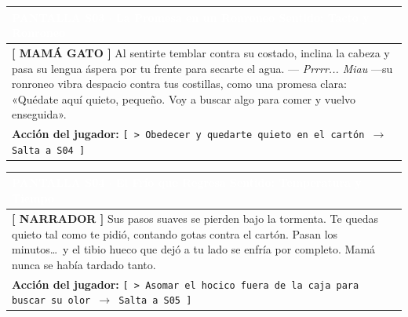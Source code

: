 \documentclass[11pt, a4paper]{article}
\begin{document}
\vspace{1em}

\noindent
\begin{tabularx}{\textwidth}{|X|}
\hline
\rowcolor{colorHeader}
\textbf{\textcolor{white}{PANTALLA S03 $\cdot$ La Promesa en un Ronroneo}} \hfill \small\textcolor{white}{Sentido: Tacto y Ronroneo} \\ \hline
\rowcolor{colorTextoBox}
\textbf{\textcolor{colorEmisor}{[ MAMÁ GATO ]}} \vspace{0.2em}\newline
Al sentirte temblar contra su costado, inclina la cabeza y pasa su lengua áspera por tu frente para secarte el agua. \newline
--- \textit{Prrrr... Miau} ---su ronroneo vibra despacio contra tus costillas, como una promesa clara: «Quédate aquí quieto, pequeño. Voy a buscar algo para comer y vuelvo enseguida». \\ \hline
\rowcolor{colorBotonBox}
\textbf{Acción del jugador:} \newline
\texttt{[ > Obedecer y quedarte quieto en el cartón $\rightarrow$ Salta a S04 ]} \\ \hline
\end{tabularx}

\vspace{1em}

\noindent
\begin{tabularx}{\textwidth}{|X|}
\hline
\rowcolor{colorHeader}
\textbf{\textcolor{white}{PANTALLA S04 $\cdot$ El Frío que Regresa}} \hfill \small\textcolor{white}{Sentido: Temperatura y Tiempo} \\ \hline
\rowcolor{colorTextoBox}
\textbf{\textcolor{colorEmisor}{[ NARRADOR ]}} \vspace{0.2em}\newline
Sus pasos suaves se pierden bajo la tormenta. Te quedas quieto tal como te pidió, contando gotas contra el cartón. Pasan los minutos\ldots\ y el tibio hueco que dejó a tu lado se enfría por completo. Mamá nunca se había tardado tanto. \\ \hline
\rowcolor{colorBotonBox}
\textbf{Acción del jugador:} \newline
\texttt{[ > Asomar el hocico fuera de la caja para buscar su olor $\rightarrow$ Salta a S05 ]} \\ \hline
\end{tabularx}

\vspace{1em}
\end{document}
